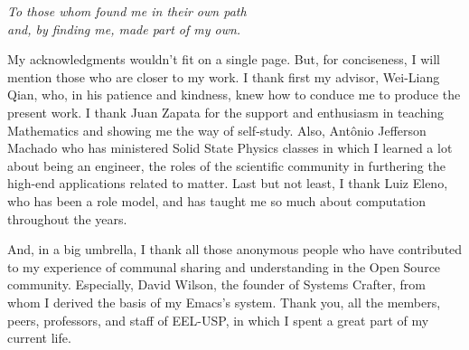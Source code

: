 \documentclass[
12pt,				%
openright,			%
oneside,			%
a4paper,			%
brazil,				%
english,			  %
]{abntex2}
\begin{document}
\begin{dedicatoria}
   \vspace*{\fill}
   \centering
   \noindent
   \textit{To those whom found me in their own path\\
     and, by finding me, made part of my own.} \vspace*{\fill}
\end{dedicatoria}

\begin{agradecimentos}

  My acknowledgments wouldn't fit on a single page. But, for
  conciseness, I will mention those who are closer to my work. I thank
  first my advisor, Wei-Liang Qian, who, in his patience and kindness,
  knew how to conduce me to produce the present work. I thank Juan
  Zapata for the support and enthusiasm in teaching Mathematics and
  showing me the way of self-study. Also, Antônio Jefferson Machado
  who has ministered Solid State Physics classes in which I learned a
  lot about being an engineer, the roles of the scientific community
  in furthering the high-end applications related to matter. Last but
  not least, I thank Luiz Eleno, who has been a role model, and
  has taught me so much about computation throughout the years.

  And, in a big umbrella, I thank all those anonymous people who have contributed to my experience of communal sharing and understanding in the Open Source community. Especially, David Wilson, the founder of Systems Crafter, from whom I derived the basis of my Emacs's system.
  Thank you, all the members, peers, professors, and staff of EEL-USP, in which I spent a great part of my current life.
\end{agradecimentos}
\end{document}
